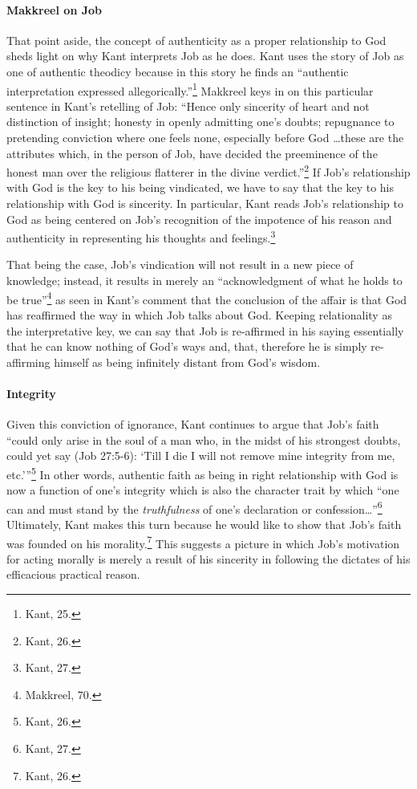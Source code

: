 \documentclass[12pt]{article}
\begin{document}
	\paragraph*{Makkreel on Job} That point aside, the concept of authenticity as a proper relationship to God sheds light on why Kant interprets Job as he does. Kant uses the story of Job as one of authentic theodicy because in this story he finds an ``authentic interpretation expressed allegorically.''\footnote{Kant, 25.} Makkreel keys in on this particular sentence in Kant's retelling of Job: ``Hence only sincerity of heart and not distinction of insight; honesty in openly admitting one's doubts; repugnance to pretending conviction where one feels none, especially before God \ldots these are the attributes which, in the person of Job, have decided the preeminence of the honest man over the religious flatterer in the divine verdict.''\footnote{Kant, 26.} If Job's relationship with God is the key to his being vindicated, we have to say that the key to his relationship with God is sincerity. In particular, Kant reads Job's relationship to God as being centered on Job's recognition of the impotence of his reason and authenticity in representing his thoughts and feelings.\footnote{Kant, 27.}
	
	That being the case, Job's vindication will not result in a new piece of knowledge; instead, it results in merely an ``acknowledgment of what he holds to be true''\footnote{Makkreel, 70.} as seen in Kant's comment that the conclusion of the affair is that God has reaffirmed the way in which Job talks about God. Keeping relationality as the interpretative key, we can say that Job is re-affirmed in his saying essentially that he can know nothing of God's ways and, that, therefore he is simply re-affirming himself as being infinitely distant from God's wisdom. 
	
	\paragraph*{Integrity} Given this conviction of ignorance, Kant continues to argue that Job's faith ``could only arise in the soul of a man who, in the midst of his strongest doubts, could yet say (Job 27:5-6): `Till I die I will not remove mine integrity from me, etc.'\thinspace''\footnote{Kant, 26.} In other words, authentic faith as being in right relationship with God is now a function of one's integrity which is also the character trait by which ``one can and must stand by the \emph{truthfulness} of one's declaration or confession\ldots''\footnote{Kant, 27.} Ultimately, Kant makes this turn because he would like to show that Job's faith was founded on his morality.\footnote{Kant, 26.} This suggests a picture in which Job's motivation for acting morally is merely a result of his sincerity in following the dictates of his efficacious practical reason.  
	
\end{document}
